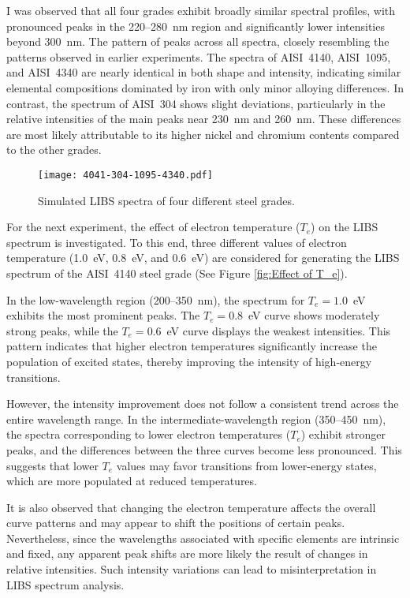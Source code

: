 \documentclass[12pt,a4paper]{article}
\begin{document}
 	I was observed that all four grades exhibit broadly similar spectral profiles, with pronounced peaks in the 220–280~nm region and significantly lower intensities beyond 300~nm. The pattern of peaks across all spectra, closely resembling the patterns observed in earlier experiments. The spectra of AISI~4140, AISI~1095, and AISI~4340 are nearly identical in both shape and intensity, indicating similar elemental compositions dominated by iron with only minor alloying differences. In contrast, the spectrum of AISI~304 shows slight deviations, particularly in the relative intensities of the main peaks near 230~nm and 260~nm. These differences are most likely attributable to its higher nickel and chromium contents compared to the other grades. 
 	
 	
	
	\begin{figure}[h!]
		\centering
		\texttt{[image: 4041-304-1095-4340.pdf]}
		\caption{Simulated LIBS spectra of four different steel grades.}
		\label{fig:4041-304-1095-4340}
	\end{figure} 
	
	For the next experiment, the effect of electron temperature ($T_e$) on the LIBS spectrum is investigated. To this end, three different values of electron temperature (1.0~eV, 0.8~eV, and 0.6~eV) are considered for generating the LIBS spectrum of the AISI~4140 steel grade (See Figure \ref{fig:Effect of T_e}). 
	
	In the low-wavelength region (200--350~nm), the spectrum for $T_e = 1.0$~eV exhibits the most prominent peaks. The $T_e = 0.8$~eV curve shows moderately strong peaks, while the $T_e = 0.6$~eV curve displays the weakest intensities. This pattern indicates that higher electron temperatures significantly increase the population of excited states, thereby improving the intensity of high-energy transitions. 
	
	However, the intensity improvement does not follow a consistent trend across the entire wavelength range. In the intermediate-wavelength region (350--450~nm), the spectra corresponding to lower electron temperatures ($T_e$) exhibit stronger peaks, and the differences between the three curves become less pronounced. This suggests that lower $T_e$ values may favor transitions from lower-energy states, which are more populated at reduced temperatures.
	
	It is also observed that changing the electron temperature affects the overall curve patterns and may appear to shift the positions of certain peaks. Nevertheless, since the wavelengths associated with specific elements are intrinsic and fixed, any apparent peak shifts are more likely the result of changes in relative intensities. Such intensity variations can lead to misinterpretation in LIBS spectrum analysis.
	
\end{document}

